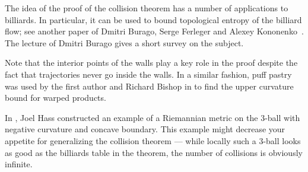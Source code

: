 The idea of the proof of the collision theorem has a number of applications to billiards.
In particular, it can be used to bound topological entropy of the billiard flow; 
see another paper of Dmitri Burago, Serge Ferleger and Alexey Kononenko~\cite{BFK-2}.
The lecture \cite{burago-icm} of Dmitri Burago gives a short survey on the subject.

Note that the interior points of the walls play a key role in the proof
despite the fact that trajectories never go inside the walls.
In a similar fashion, puff pastry was used by the first author and Richard Bishop in \cite{a-b:warped}
to find the upper curvature bound for warped products.

In \cite{hass},
Joel Hass constructed an example of a Riemannian metric on the 3-ball with negative curvature and concave boundary.
This example might decrease your appetite for generalizing the collision theorem --- while
locally such a 3-ball looks as good as the billiards table in the theorem, the number of collisions is obviously infinite.



